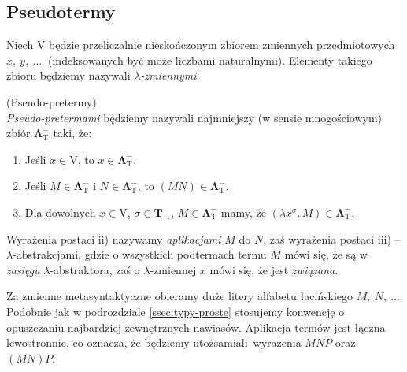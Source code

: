 \subsection{Pseudotermy}
  Niech \(\mathrm{V}\) będzie przeliczalnie nieskończonym zbiorem zmiennych przedmiotowych \(x,\ y,\ \dots\ \) (indeksowanych być może liczbami naturalnymi). Elementy takiego zbioru będziemy nazywali \emph{\(\lambda\)-zmiennymi}.
\begin{definicja}(Pseudo-pretermy)\\
  \emph{Pseudo-pretermami} będziemy nazywali najmniejszy (w sensie mnogościowym) zbiór \(\mathbf{\Lambda}^{-}_{\mathrm{T}}\) taki, że:
  \begin{enumerate}[label=\roman*)]
    \item Jeśli \(x\in \mathrm{V}\), to \(x\in\mathbf{\Lambda}^{-}_{\mathrm{T}}\).
    \item Jeśli \(M\in\mathbf{\Lambda}^{-}_{\mathrm{T}}\) i \(N\in\mathbf{\Lambda}^{-}_{\mathrm{T}}\), to \((MN)\in\mathbf{\Lambda}^{-}_{\mathrm{T}}\).
    \item Dla dowolnych \(x\in \mathrm{V}\), \(\sigma\in\mathbf{T}_\to\), \(M\in\mathbf{\Lambda}^{-}_{\mathrm{T}}\) mamy, że \((\lambda x^{\sigma}.\,M)\in \mathbf{\Lambda}^{-}_{\mathrm{T}}\).
  \end{enumerate}
\end{definicja}
  Wyrażenia postaci ii) nazywamy \emph{aplikacjami} \(M\) do \(N\), zaś wyrażenia postaci iii) -- \(\lambda\)-abstrakcjami, gdzie o wszystkich podtermach termu \(M\) mówi się, że są w \emph{zasięgu} \(\lambda\)-abstraktora, zaś o \(\lambda\)-zmiennej \(x\) mówi się, że jest \emph{związana}.

  Za zmienne metasyntaktyczne obieramy duże litery alfabetu łacińskiego \(M,\ N,\ \dots\ \) Podobnie jak w podrozdziale \ref{ssec:typy-proste} stosujemy konwencję o opuszczaniu najbardziej zewnętrznych nawiasów. Aplikacja termów jest łączna lewostronnie, co oznacza, że będziemy utożsamiali wyrażenia \(MNP\) oraz \((MN)P\).

